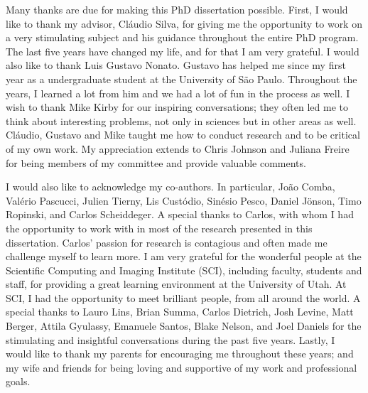 
Many thanks are due for making this PhD dissertation possible. 
%
First, I would like to thank my advisor, Cl\'audio Silva, for giving me the opportunity to work on a very stimulating subject and his guidance throughout the entire PhD program. The last five years have changed my life, and for that I am very grateful.
%
I would also like to thank Luis Gustavo Nonato. Gustavo has helped me since my first year as a undergraduate student at the University of S\~ao Paulo. Throughout the years, I learned a lot from him and we had a lot of fun in the process as well.
%
I wish to thank Mike Kirby for our inspiring conversations; they often led me to think about interesting problems, not only in sciences but in other areas as well. 
%
Cl\'audio, Gustavo and Mike taught me how to conduct research and to be critical of my own work.  
%
My appreciation extends to Chris Johnson and Juliana Freire for being members of my committee and provide valuable comments. 

I would also like to acknowledge my co-authors. In particular, Jo\~ao Comba, Val\'erio Pascucci, Julien Tierny,  Lis Cust\'odio, Sin\'esio Pesco, Daniel J\"onson, Timo Ropinski, and  Carlos Scheiddeger. A special thanks to Carlos, with whom I had the opportunity to work with in most of the research presented in this dissertation. Carlos' passion for research is contagious and often made me challenge myself to learn more.
%
I am very grateful for the wonderful people at the Scientific Computing and Imaging Institute (SCI), including faculty, students and staff,  for providing a great learning environment at the University of Utah. 
%
At SCI, I had the opportunity to meet brilliant people, from all around the world.
%
A special thanks to Lauro Lins, Brian Summa, Carlos Dietrich, Josh Levine, Matt Berger, Attila Gyulassy, Emanuele Santos, Blake Nelson, and Joel Daniels for the stimulating and insightful conversations during the past five years.
%
Lastly, I would like to thank my parents for encouraging me throughout these years; and my wife and friends for being loving and supportive of my work and professional goals.